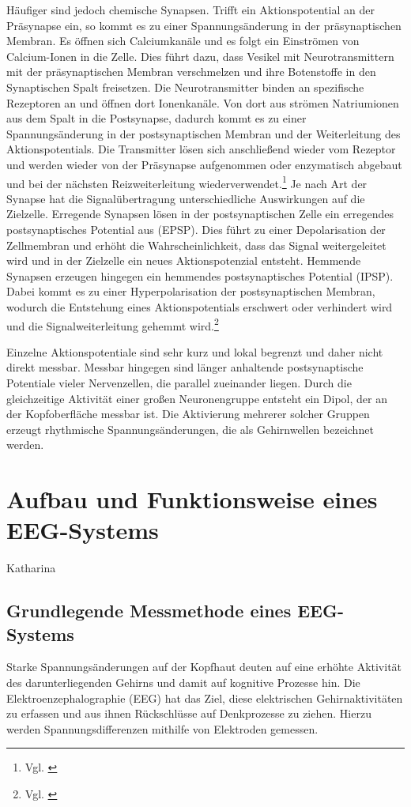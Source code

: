 Häufiger sind jedoch chemische Synapsen. Trifft ein Aktionspotential an der Präsynapse ein, so kommt es zu einer Spannungsänderung in der präsynaptischen Membran. Es öffnen sich Calciumkanäle und es folgt ein Einströmen von Calcium-Ionen in die Zelle. Dies führt dazu, dass Vesikel mit Neurotransmittern mit der präsynaptischen Membran verschmelzen und ihre Botenstoffe in den Synaptischen Spalt freisetzen. Die Neurotransmitter binden an spezifische Rezeptoren an und öffnen dort Ionenkanäle. Von dort aus strömen Natriumionen aus dem Spalt in die Postsynapse, dadurch kommt es zu einer Spannungsänderung in der postsynaptischen Membran und der Weiterleitung des Aktionspotentials. Die Transmitter lösen sich anschließend wieder vom Rezeptor und werden wieder von der Präsynapse aufgenommen oder enzymatisch abgebaut und bei der nächsten Reizweiterleitung wiederverwendet.\footnote{Vgl. \cite{studyflix_nervenzelle}} Je nach Art der Synapse hat die Signalübertragung unterschiedliche Auswirkungen auf die Zielzelle. Erregende Synapsen lösen in der postsynaptischen Zelle ein erregendes postsynaptisches Potential aus (EPSP). Dies führt zu einer Depolarisation der Zellmembran und erhöht die Wahrscheinlichkeit, dass das Signal weitergeleitet wird und in der Zielzelle ein neues Aktionspotenzial entsteht. Hemmende Synapsen erzeugen hingegen ein hemmendes postsynaptisches Potential (IPSP). Dabei kommt es zu einer Hyperpolarisation der postsynaptischen Membran, wodurch die Entstehung eines Aktionspotentials erschwert oder verhindert wird und die Signalweiterleitung gehemmt wird.\footnote{Vgl. \cite{studyflix_epsp_ipsp}}

Einzelne Aktionspotentiale sind sehr kurz und lokal begrenzt und daher nicht direkt messbar. Messbar hingegen sind länger anhaltende postsynaptische Potentiale vieler Nervenzellen, die parallel zueinander liegen. Durch die gleichzeitige Aktivität einer großen Neuronengruppe entsteht ein Dipol, der an der Kopfoberfläche messbar ist. Die Aktivierung mehrerer solcher Gruppen erzeugt rhythmische Spannungsänderungen, die als Gehirnwellen bezeichnet werden. 




\section{Aufbau und Funktionsweise eines EEG-Systems}
Katharina \newline
\subsection{Grundlegende Messmethode eines EEG-Systems}
Starke Spannungsänderungen auf der Kopfhaut deuten auf eine erhöhte Aktivität des darunterliegenden Gehirns und damit auf kognitive Prozesse hin. Die Elektroenzephalographie (EEG) hat das Ziel, diese elektrischen Gehirnaktivitäten zu erfassen und aus ihnen Rückschlüsse auf Denkprozesse zu ziehen. Hierzu werden Spannungsdifferenzen mithilfe von Elektroden gemessen.

